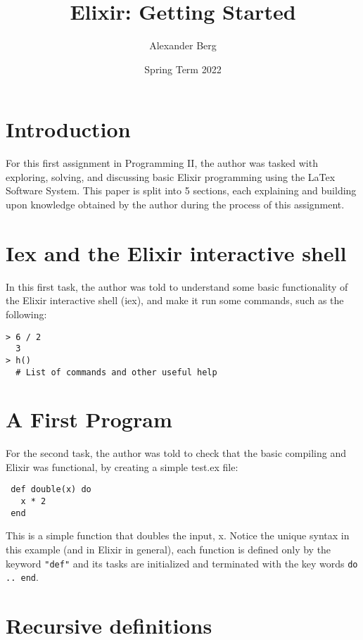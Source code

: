 \documentclass[a4paper,11pt]{article}
\begin{document}
\title{
    \textbf{Elixir: Getting Started}
}
\author{Alexander Berg}
\date{Spring Term 2022}

\maketitle

\section*{Introduction}

For this first assignment in Programming II, the author was tasked with exploring, solving, and discussing basic Elixir programming using the LaTex Software System. This paper is split into 5 sections, each explaining and building upon knowledge obtained by the author during the process of this assignment.

\section*{Iex and the Elixir interactive shell}

In this first task, the author was told to understand some basic functionality of the Elixir interactive shell (iex), and make it run some commands, such as the following:

\begin{verbatim}
> 6 / 2
  3
> h()
  # List of commands and other useful help
\end{verbatim}

\section*{A First Program}

For the second task, the author was told to check that the basic compiling and Elixir was functional, by creating a simple test.ex file:

\begin{verbatim}
 def double(x) do
   x * 2
 end
\end{verbatim}

This is a simple function that doubles the input, x. Notice the unique syntax in this example (and in Elixir in general), each function is defined only by the keyword {\tt "def"} and its tasks are initialized and terminated with the key words {\tt do .. end}. 

\section*{Recursive definitions}
\end{document}
